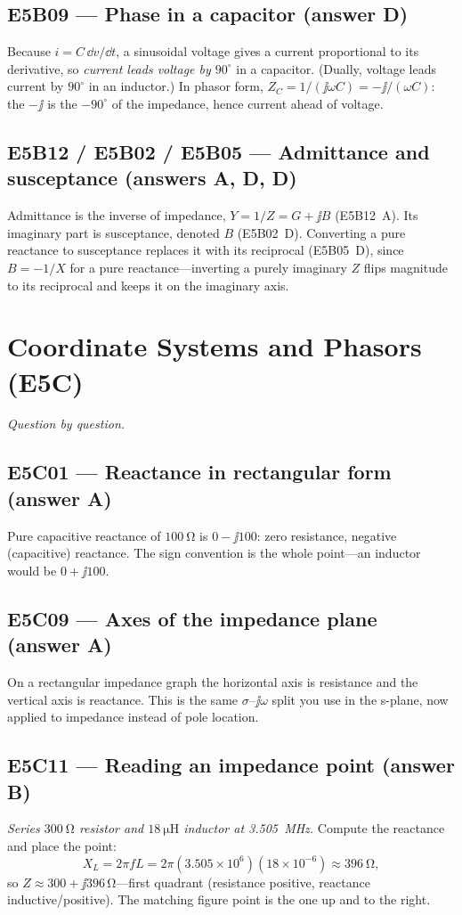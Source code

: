 \subsection*{E5B09 --- Phase in a capacitor (answer D)}
Because \(i=C\,\dd v/\dd t\), a sinusoidal voltage gives a current proportional to
its derivative, so \emph{current leads voltage by \(90^\circ\)} in a capacitor.
(Dually, voltage leads current by \(90^\circ\) in an inductor.) In phasor form,
\(Z_C=1/(\jj\omega C)=-\jj/(\omega C)\): the \(-\jj\) is the \(-90^\circ\) of the
impedance, hence current ahead of voltage.

\subsection*{E5B12 / E5B02 / E5B05 --- Admittance and susceptance (answers A, D, D)}
Admittance is the inverse of impedance, \(Y=1/Z=G+\jj B\) (E5B12~A). Its imaginary
part is susceptance, denoted \(B\) (E5B02~D). Converting a pure reactance to
susceptance replaces it with its reciprocal (E5B05~D), since \(B=-1/X\) for a pure
reactance---inverting a purely imaginary \(Z\) flips magnitude to its reciprocal
and keeps it on the imaginary axis.

\section{Coordinate Systems and Phasors (E5C)}
\emph{Question by question.}

\subsection*{E5C01 --- Reactance in rectangular form (answer A)}
Pure capacitive reactance of \(\SI{100}{\ohm}\) is \(0-\jj100\): zero resistance,
negative (capacitive) reactance. The sign convention is the whole point---an
inductor would be \(0+\jj100\).

\subsection*{E5C09 --- Axes of the impedance plane (answer A)}
On a rectangular impedance graph the horizontal axis is resistance and the
vertical axis is reactance. This is the same \(\sigma\)--\(\jj\omega\) split you
use in the s-plane, now applied to impedance instead of pole location.

\subsection*{E5C11 --- Reading an impedance point (answer B)}
\emph{Series \(\SI{300}{\ohm}\) resistor and \(\SI{18}{\micro\henry}\) inductor at
\SI{3.505}{\mega\hertz}.} Compute the reactance and place the point:
\[
X_L=2\pi f L=2\pi(3.505\times10^6)(18\times10^{-6})\approx\SI{396}{\ohm},
\]
so \(Z\approx300+\jj396\,\si{\ohm}\)---first quadrant (resistance positive, reactance
inductive/positive). The matching figure point is the one up and to the right.

